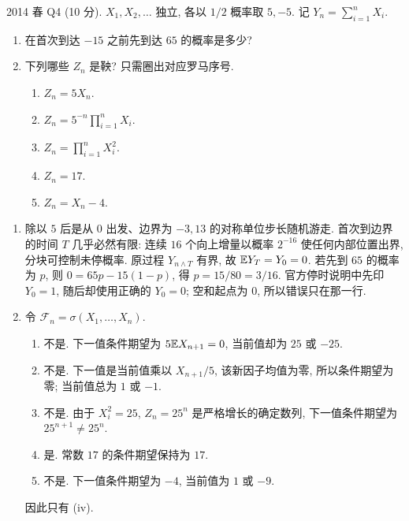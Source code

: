 \begin{exercise}\label{ex:fe2014q4}
2014 春 Q4 (10 分). $X_1,X_2,\ldots$ 独立, 各以 $1/2$ 概率取 $5,-5$. 记 $Y_n=\sum_{i=1}^nX_i$.
\begin{enumerate}[label=(\alph*)]
\item\label{ex:fe2014q4-a} 在首次到达 $-15$ 之前先到达 $65$ 的概率是多少?
\item 下列哪些 $Z_n$ 是鞅? 只需圈出对应罗马序号.
\begin{enumerate}[label=(\roman*)]
\item\label{ex:fe2014q4-b-i} $Z_n=5X_n$.
\item\label{ex:fe2014q4-b-ii} $Z_n=5^{-n}\prod_{i=1}^nX_i$.
\item\label{ex:fe2014q4-b-iii} $Z_n=\prod_{i=1}^nX_i^2$.
\item\label{ex:fe2014q4-b-iv} $Z_n=17$.
\item\label{ex:fe2014q4-b-v} $Z_n=X_n-4$.
\end{enumerate}
\end{enumerate}
\end{exercise}
\begin{solution}
\begin{enumerate}[label=(\alph*)]
\item\label{sol:fe2014q4-a} 除以 $5$ 后是从 $0$ 出发、边界为 $-3,13$ 的对称单位步长随机游走. 首次到边界的时间 $T$ 几乎必然有限: 连续 $16$ 个向上增量以概率 $2^{-16}$ 使任何内部位置出界, 分块可控制未停概率. 原过程 $Y_{n\wedge T}$ 有界, 故 $\mathbb E Y_T=Y_0=0$. 若先到 $65$ 的概率为 $p$, 则 $0=65p-15(1-p)$, 得 $p=15/80=3/16$. 官方停时说明中先印 $Y_0=1$, 随后却使用正确的 $Y_0=0$; 空和起点为 $0$, 所以错误只在那一行.
\item 令 $\mathcal F_n=\sigma(X_1,\ldots,X_n)$.
\begin{enumerate}[label=(\roman*)]
\item\label{sol:fe2014q4-b-i} 不是. 下一值条件期望为 $5\mathbb E X_{n+1}=0$, 当前值却为 $25$ 或 $-25$.
\item\label{sol:fe2014q4-b-ii} 不是. 下一值是当前值乘以 $X_{n+1}/5$, 该新因子均值为零, 所以条件期望为零; 当前值总为 $1$ 或 $-1$.
\item\label{sol:fe2014q4-b-iii} 不是. 由于 $X_i^2=25$, $Z_n=25^n$ 是严格增长的确定数列, 下一值条件期望为 $25^{n+1}\ne25^n$.
\item\label{sol:fe2014q4-b-iv} 是. 常数 $17$ 的条件期望保持为 $17$.
\item\label{sol:fe2014q4-b-v} 不是. 下一值条件期望为 $-4$, 当前值为 $1$ 或 $-9$.
\end{enumerate}
因此只有 (iv).
\end{enumerate}
\end{solution}


